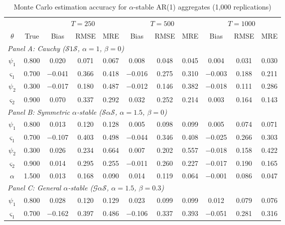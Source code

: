 \begin{table}[!h]
\centering
\caption{Monte Carlo estimation accuracy for $\alpha$-stable AR(1) aggregates (1{,}000 replications)}
\label{tab:mc_accuracy_full}
\begin{tabular}{ccccccccccc}
\toprule
& & \multicolumn{3}{c}{$T = 250$} & \multicolumn{3}{c}{$T = 500$} & \multicolumn{3}{c}{$T = 1000$} \\
\cmidrule(lr){3-5} \cmidrule(lr){6-8} \cmidrule(lr){9-11}
$\theta$ & True & Bias & RMSE & MRE & Bias & RMSE & MRE & Bias & RMSE & MRE \\
\midrule
\multicolumn{11}{l}{\textit{Panel A: Cauchy ($\mathcal{S}1\mathcal{S}$, $\alpha = 1$, $\beta = 0$)}} \\[3pt]
$\psi_1$ & 0.800 & 0.020 & 0.071 & 0.067 & 0.008 & 0.048 & 0.045 & 0.004 & 0.031 & 0.030 \\
$\varsigma_{1}$ & 0.700 & $-$0.041 & 0.366 & 0.418 & $-$0.016 & 0.275 & 0.310 & $-$0.003 & 0.188 & 0.211 \\
$\psi_2$ & 0.300 & $-$0.017 & 0.180 & 0.487 & $-$0.012 & 0.146 & 0.382 & $-$0.018 & 0.111 & 0.286 \\
$\varsigma_{2}$ & 0.900 & 0.070 & 0.337 & 0.292 & 0.032 & 0.252 & 0.214 & 0.003 & 0.164 & 0.143 \\[6pt]
\multicolumn{11}{l}{\textit{Panel B: Symmetric $\alpha$-stable ($\mathcal{S}\alpha\mathcal{S}$, $\alpha = 1.5$, $\beta = 0$)}} \\[3pt]
$\psi_1$ & 0.800 & 0.013 & 0.120 & 0.128 & 0.005 & 0.098 & 0.099 & 0.005 & 0.074 & 0.071 \\
$\varsigma_{1}$ & 0.700 & $-$0.107 & 0.403 & 0.498 & $-$0.044 & 0.346 & 0.408 & $-$0.025 & 0.266 & 0.303 \\
$\psi_2$ & 0.300 & 0.026 & 0.234 & 0.664 & 0.007 & 0.202 & 0.557 & $-$0.018 & 0.158 & 0.422 \\
$\varsigma_{2}$ & 0.900 & 0.014 & 0.295 & 0.255 & $-$0.011 & 0.260 & 0.227 & $-$0.017 & 0.190 & 0.165 \\
$\alpha$ & 1.500 & 0.013 & 0.168 & 0.090 & 0.014 & 0.119 & 0.064 & $-$0.001 & 0.086 & 0.047 \\[6pt]
\multicolumn{11}{l}{\textit{Panel C: General $\alpha$-stable ($\mathcal{G}\alpha\mathcal{S}$, $\alpha = 1.5$, $\beta = 0.3$)}} \\[3pt]
$\psi_1$ & 0.800 & 0.028 & 0.120 & 0.129 & 0.023 & 0.099 & 0.099 & 0.012 & 0.079 & 0.076 \\
$\varsigma_{1}$ & 0.700 & $-$0.162 & 0.397 & 0.486 & $-$0.106 & 0.337 & 0.393 & $-$0.051 & 0.281 & 0.316 \\

\end{tabular}
\end{table}
